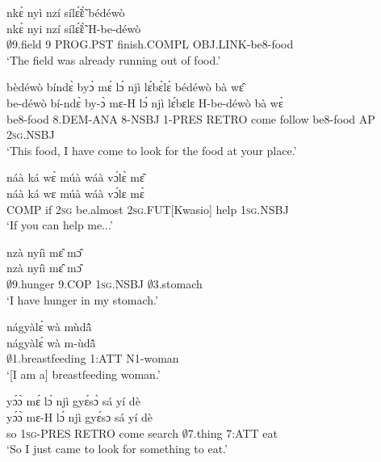 \begin{exe} 
\exN\label{40}
  \glll nkɛ̀ nyì nzí sílɛ̃́ɛ̃̀ bédéwò \\
          nkɛ̀ nyi nzí sílɛ̃́ɛ̃̀ H-be-déwò \\
          $\emptyset$9.field 9 PROG.PST finish.COMPL OBJ.LINK-be8-food   \\
    \trans `The field was already running out of food.'
\end{exe}

\begin{exe} 
\exN\label{41}
  \glll bèdéwò bíndɛ̀ byɔ̀ mɛ́ lɔ́ njì lɛ́bɛ̀lɛ̀ bédéwò bà wɛ̂ \\
        be-déwò bí-ndɛ̀ by-ɔ̀ mɛ-H lɔ́ njì lɛ́bɛlɛ H-be-déwò bà wɛ̀ \\
           be8-food 8.DEM-ANA 8-NSBJ 1-PRES RETRO come  follow be8-food AP 2\textsc{sg}.NSBJ  \\
    \trans `This food, I have come to look for the food at your place.'
\end{exe}

\begin{exe} 
\exN\label{42}
  \glll  náà ká wɛ̀ múà wáà vɔ́lɛ̀ mɛ̂ \\
        náà ká wɛ múà wáà vɔ́lɛ mɛ̀ \\
          COMP if 2\textsc{sg} be.almost 2\textsc{sg}.FUT[Kwasio] help 1\textsc{sg}.NSBJ \\
    \trans `If you can help me...'
\end{exe}

\begin{exe} 
\exN\label{43}
  \glll  nzà nyíì mɛ̂ mɔ̂ \\
          nzà nyíì mɛ̂ mɔ̂ \\
           $\emptyset$9.hunger 9.COP 1\textsc{sg}.NSBJ $\emptyset$3.stomach  \\
    \trans `I have hunger in my stomach.'
\end{exe}

\begin{exe} 
\exN\label{44}
  \glll nágyàlɛ́ wà mùdã̂ \\
        nágyàlɛ́ wà m-ùdã̂ \\
           $\emptyset$1.breastfeeding 1:ATT N1-woman \\
    \trans `[I am a] breastfeeding woman.'
\end{exe}

\begin{exe} 
\exN\label{45}
  \glll yɔ́ɔ̀ mɛ́ lɔ́ njì gyɛ́sɔ̀ sá yí dè \\
       yɔ́ɔ̀ mɛ-H lɔ́ njì gyɛ́sɔ sá yí dè \\
         so 1\textsc{sg}-PRES RETRO come search $\emptyset$7.thing 7:ATT eat    \\
    \trans `So I just came to look for something to eat.'
\end{exe}

